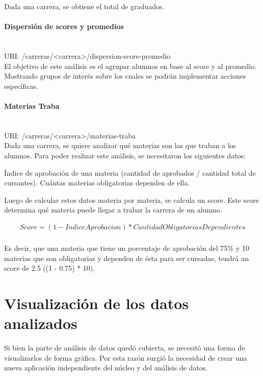 Dada una carrera, se obtiene el total de graduados.


\paragraph{Dispersión de scores y promedios}\mbox{}\\
URI: /carreras/<carrera>/dispersion-score-promedio \\

El objetivo de este análisis es el agrupar alumnos en base al score y al promedio. Mostrando grupos de interés sobre los cuales se podrán implementar acciones específicas.

\paragraph{Materias Traba}\mbox{}\\

URI: /carreras/<carrera>/materias-traba \\

Dada una carrera, se quiere analizar qué materias son las que traban a los alumnos. 
Para poder realizar este análisis, se necesitaron los siguientes datos:
\begin{outline}
\1 Índice de aprobación de una materia (cantidad de aprobados / cantidad total de cursantes).
\1 Cuántas materias obligatorias dependen de ella.
\end{outline}

Luego de calcular estos datos materia por materia, se calcula un score. Este score determina qué materia puede llegar a trabar la carrera de un alumno.

\begin{align*}
  Score = (1 - IndiceAprobacion) * CantidadObligatoriasDependientes\\
\end{align*}

Es decir, que una materia que tiene un porcentaje de aprobación del 75\% y 10 materias que son obligatorias y dependen de ésta para ser cursadas, tendrá un score de 2.5 ((1 - 0.75) * 10).



\section[Visualización de los datos analizados]{Visualización de los datos analizados}

Si bien la parte de análisis de datos quedó cubierta, se necesitó una forma de visualizarlos de forma gráfica. Por esta razón surgió la necesidad de crear una nueva aplicación independiente del núcleo y del análisis de datos.

